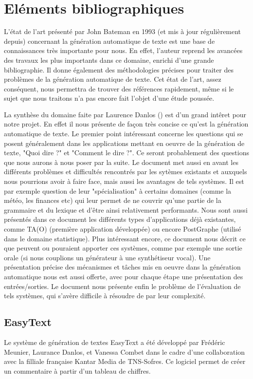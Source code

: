 \documentclass[12pt]{report}
\begin{document}
\section{Eléments bibliographiques}

L'état de l'art \cite{Bat93} présenté par John Bateman en 1993 (et mis à jour régulièrement depuis) concernant la génération automatique de texte est une base de connaissances très importante pour nous. En effet, l'auteur reprend les avancées des travaux les plus importants dans ce domaine, enrichi d'une grande bibliographie. Il donne également des méthodologies précises pour traiter des problèmes de la génération automatique de texte.
Cet état de l'art, assez conséquent, nous permettra de trouver des références rapidement, même si le sujet que nous traitons n'a pas encore fait l'objet d'une étude poussée.


La synthèse du domaine faite par Laurence Danlos (\cite{Dan00}) est d'un grand intêret pour notre projet. En effet il nous présente de façon très concise ce qu'est la génération automatique de texte. Le premier point intéressant concerne les questions qui se posent généralement dans les applications mettant en oeuvre de la génération de texte, "Quoi dire ?" et "Comment le dire ?". Ce seront probablement des questions que nous aurons à nous poser par la suite. Le document met aussi en avant les différents problèmes et difficultés rencontrés par les sytèmes existants et auxquels nous pourrions avoir à faire face, mais aussi les avantages de tels systèmes. Il est par exemple question de leur "spécialisation" à certains domaines (comme la météo, les finances etc) qui leur permet de ne couvrir qu'une partie de la grammaire et du lexique et d'être ainsi relativement performants. Nous sont aussi présentés dans ce document les différents types d'applications déjà existantes, comme TA(O) (première application développée) ou encore PostGraphe (utilisé dans le domaine statistique). Plus intéressant encore, ce document nous décrit ce que peuvent ou pouraient apporter ces systèmes, comme par exemple une sortie orale (si nous couplions un générateur à une synthétiseur vocal). Une présentation précise des mécanismes et tâches mis en oeuvre dans la génération automatique nous est aussi offerte, avec pour chaque étape une présentation des entrées/sorties. Le document nous présente enfin le problème de l'évaluation de tels systèmes, qui s'avère difficile à résoudre de par leur complexité.

\subsection{EasyText}
Le système de génération de textes EasyText \cite{Dan11} a été développé par Frédéric Meunier, Laurance Danlos, et Vanessa Combet dans le cadre d'une collaboration avec la filliale française Kantar Media de TNS-Sofres. Ce logiciel permet de créer un commentaire à partir d'un tableau de chiffres. 
\end{document}
